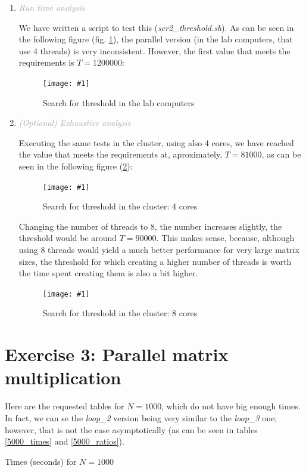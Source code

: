 \documentclass{article}
\newcommand{\myFigure}[4]{%
    \begin{figure}[!ht]
        \texttt{[image: \#1]}
        \centering
        \caption{#2}
        \label{#3}
    \end{figure}
}
\newcommand{\greyItem}[1]{\item\emph{\textcolor{darkgray}{#1}}}
\begin{document}
\begin{enumerate}[label=2.\arabic*,leftmargin=*]
\greyItem{Run time analysis}

We have written a script to test this (\emph{scr2\_threshold.sh}). As can be seen in the following figure (fig. \ref{threshold}), the parallel version (in the lab computers, that use 4 threads) is very inconsistent. However, the first value that meets the requirements is $T=1200000$:

\myFigure{../material/outputs/out2_final/threshold0.png}{Search for threshold in the lab computers}{threshold}{.7}

\pagebreak

\greyItem{(Optional) Exhaustive analysis}

Executing the same tests in the cluster, using also 4 cores, we have reached the value that meets the requirements at, aproximately, $T=81000$, as can be seen in the following figure (\ref{threshold_cluster4}):

\myFigure{../material/outputs/out2_final/threshold_4proc.png}{Search for threshold in the cluster: 4 cores}{threshold_cluster4}{.66}

Changing the number of threads to 8, the number increases slightly, the threshold would be around $T=90000$. This makes sense, because, although using 8 threads would yield a much better performance for very large matrix sizes, the threshold for which creating a higher number of threads is worth the time spent creating them is also a bit higher.

\myFigure{../material/outputs/out2_final/threshold_8proc.png}{Search for threshold in the cluster: 8 cores}{threshold_cluster8}{.66}

\end{enumerate}


\pagebreak

\section{Exercise 3: Parallel matrix multiplication}

Here are the requested tables for $N=1000$, which do not have big enough times. In fact, we can se the \emph{loop\_2} version being very similar to the \emph{loop\_3} one; however, that is not the case asymptotically (as can be seen in tables \ref{5000_times} and \ref{5000_ratios}).

\begin{table}[h]
    
    \centering
    \caption{Times (seconds) for $N=1000$}
\end{table}
\end{document}
